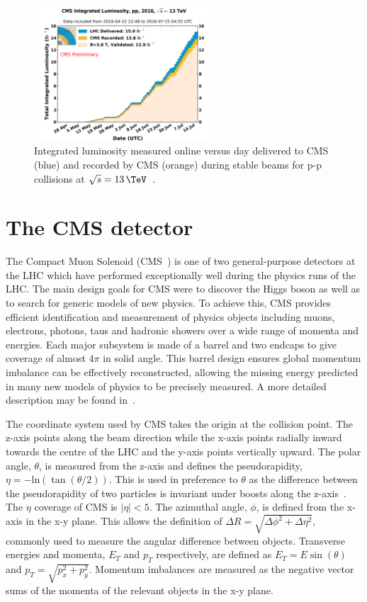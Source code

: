 \begin{figure}
\centering
    \includegraphics[width=0.6\textwidth]{./Figures/detector/int_lumi_per_day_cumulative_pp_2016_Golden_ICHEP}
  \caption{Integrated luminosity measured online versus day delivered to CMS (blue)
  and recorded by CMS (orange) during stable beams for p-p collisions at $\sqrt{s} = 13\,\TeV$~\cite{cmslumi}.}
  \label{fig:LHC-integrated-lumi}
\end{figure}

\section{The CMS detector}
The Compact Muon Solenoid (CMS~\cite{CMS}) is one of two general-purpose detectors at the LHC 
which have performed exceptionally well during the physics runs of the LHC. The main design goals
for CMS were to discover the Higgs boson as well as to search for generic models 
of new physics. To achieve this, CMS provides efficient identification and measurement
of physics objects including muons, electrons, photons, taus and hadronic showers over a
wide range of momenta and energies. Each major subsystem is made of a barrel
and two endcaps to give coverage of almost $4\pi$ in solid angle. 
This barrel design ensures global momentum imbalance can be effectively 
reconstructed, allowing the missing energy predicted in many new models of physics to be
precisely measured. A more detailed description may be found in~\cite{CMS}.  

The coordinate system used by CMS takes the origin at 
the collision point. The z-axis points along the beam direction while the x-axis points radially inward
towards the centre of the LHC and the y-axis points vertically upward.
The polar angle, $\theta$, is measured from the z-axis and defines the pseudorapidity, $\eta=-\text{ln}(\tan(\theta/2))$. 
This is used in preference to $\theta$ as the difference between the pseudorapidity of two 
particles is invariant under boosts along the z-axis~\cite{cms_iop}. 
The $\eta$ coverage of CMS is $|\eta|<5$. The azimuthal angle, $\phi$, is defined from the x-axis in the x-y plane.
This allows the definition of $\Delta R = \sqrt{\Delta\phi^2+\Delta\eta^2}$, commonly used to measure the 
angular difference between objects. Transverse energies and momenta, $E_T $ and $p_T$ respectively, are defined 
as $E_T = E\sin(\theta)$ and $p_T = \sqrt{p_{x}^2+p_{y}^2}$. Momentum imbalances are measured as the negative 
vector sums of the momenta of the relevant objects in the x-y plane. 

